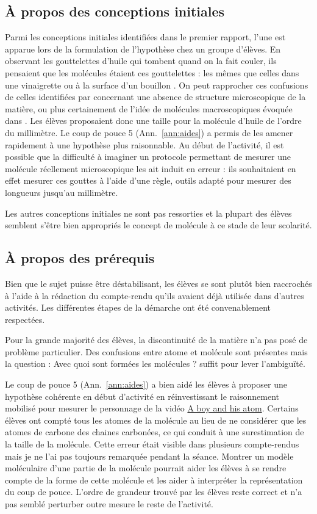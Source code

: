 \documentclass[12pt,a4paper, fleqn]{report}
\begin{document}
\subsection{À propos des conceptions initiales}

Parmi les conceptions initiales identifiées dans le premier rapport, l'une est apparue lors de la formulation de l'hypothèse chez un groupe d'élèves.
En observant les gouttelettes d'huile qui tombent quand on la fait couler, ils pensaient que les molécules étaient ces gouttelettes : \og les mêmes que celles dans une vinaigrette ou à la surface d'un bouillon \fg{}.
On peut rapprocher ces confusions de celles identifiées par \cite{Bain1985} concernant une absence de structure microscopique de la matière, ou plus certainement de l'idée de molécules macroscopiques évoquée dans \cite{Griffiths1992}.
Les élèves proposaient donc une taille pour la molécule d'huile de l'ordre du millimètre.
Le coup de pouce 5 (Ann.~\ref{ann:aides}) a permis de les amener rapidement à une hypothèse plus raisonnable.
Au début de l'activité, il est possible que la difficulté à imaginer un protocole permettant de mesurer une molécule réellement microscopique les ait induit en erreur : ils souhaitaient en effet mesurer ces gouttes à l'aide d'une règle, outils adapté pour mesurer des longueurs jusqu'au millimètre.

Les autres conceptions initiales ne sont pas ressorties et la plupart des élèves semblent s'être bien appropriés le concept de molécule à ce stade de leur scolarité.

\subsection{À propos des prérequis}

Bien que le sujet puisse être déstabilisant, les élèves se sont plutôt bien raccrochés à l'aide à la rédaction du compte-rendu qu'ils avaient déjà utilisée dans d'autres activités.
Les différentes étapes de la démarche ont été convenablement respectées.

Pour la grande majorité des élèves, la discontinuité de la matière n'a pas posé de problème particulier.
Des confusions entre atome et molécule sont présentes mais la question : \og Avec quoi sont formées les molécules ? \fg{} suffit pour lever l'ambiguïté.

Le coup de pouce 5 (Ann.~\ref{ann:aides}) a bien aidé les élèves à proposer une hypothèse cohérente en début d'activité en réinvestissant le raisonnement mobilisé pour mesurer le personnage de la vidéo \href{https://youtu.be/oSCX78-8-q0}{A boy and his atom}.
Certains élèves ont compté tous les atomes de la molécule au lieu de ne considérer que les atomes de carbone des chaines carbonées, ce qui conduit à une surestimation de la taille de la molécule.
Cette \og erreur \fg{} était visible dans plusieurs compte-rendus mais je ne l'ai pas toujours remarquée pendant la séance.
Montrer un modèle moléculaire d'une partie de la molécule pourrait aider les élèves à se rendre compte de la forme de cette molécule et les aider à interpréter la représentation du coup de pouce.
L'ordre de grandeur trouvé par les élèves reste correct et n'a pas semblé perturber outre mesure le reste de l'activité.
\end{document}
